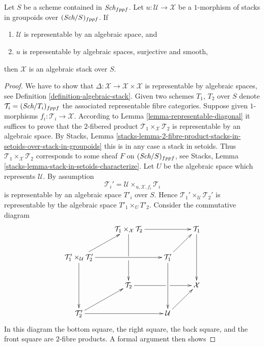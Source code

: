 \begin{lemma}
\label{lemma-smooth-surjective-morphism-implies-algebraic}
Let $S$ be a scheme contained in $\textit{Sch}_{fppf}$.
Let $u : \mathcal{U} \to \mathcal{X}$ be a $1$-morphism of
stacks in groupoids over $(\textit{Sch}/S)_{fppf}$. If
\begin{enumerate}
\item $\mathcal{U}$ is representable by an algebraic space, and
\item $u$ is representable by algebraic spaces, surjective and smooth,
\end{enumerate}
then $\mathcal X$ is an algebraic stack over $S$. 
\end{lemma}

\begin{proof}
We have to show that $\Delta : \mathcal{X} \to \mathcal{X} \times \mathcal{X}$
is representable by algebraic spaces, see
Definition \ref{definition-algebraic-stack}.
Given two schemes $T_1$, $T_2$ over $S$ denote
$\mathcal{T}_i = (\textit{Sch}/T_i)_{fppf}$ the associated representable
fibre categories. Suppose given $1$-morphisms
$f_i : \mathcal{T}_i \to \mathcal{X}$.
According to
Lemma \ref{lemma-representable-diagonal}
it suffices to prove that the $2$-fibered
product $\mathcal{T}_1 \times_{\mathcal{X}} \mathcal{T}_2$
is representable by an algebraic space. By
Stacks, Lemma
\ref{stacks-lemma-2-fibre-product-stacks-in-setoids-over-stack-in-groupoids}
this is in any case a stack in setoids. Thus
$\mathcal{T}_1 \times_{\mathcal{X}} \mathcal{T}_2$ corresponds
to some sheaf $F$ on $(\textit{Sch}/S)_{fppf}$, see
Stacks, Lemma \ref{stacks-lemma-stack-in-setoids-characterize}.
Let $U$ be the algebraic space which represents $\mathcal{U}$.
By assumption
$$
\mathcal{T}_i' = \mathcal{U} \times_{u, \mathcal{X}, f_i} \mathcal{T}_i
$$
is representable by an algebraic space $T'_i$ over $S$. Hence
$\mathcal{T}_1' \times_\mathcal{U} \mathcal{T}_2'$ is representable
by the algebraic space $T'_1 \times_U T'_2$.
Consider the commutative diagram
$$
\xymatrix{
&
\mathcal{T}_1 \times_{\mathcal X} \mathcal{T}_2 \ar[rr]\ar'[d][dd] & &
\mathcal{T}_1 \ar[dd] \\ 
\mathcal{T}_1' \times_\mathcal{U} \mathcal{T}_2' \ar[ur]\ar[rr]\ar[dd] & &
\mathcal{T}_1' \ar[ur]\ar[dd] \\ 
&
\mathcal{T}_2 \ar'[r][rr] & &
\mathcal X \\ 
\mathcal{T}_2' \ar[rr]\ar[ur] & &
\mathcal{U} \ar[ur] }
$$
In this diagram the bottom square, the right square, the back square, and
the front square are $2$-fibre products. A formal argument then shows

\end{proof}
